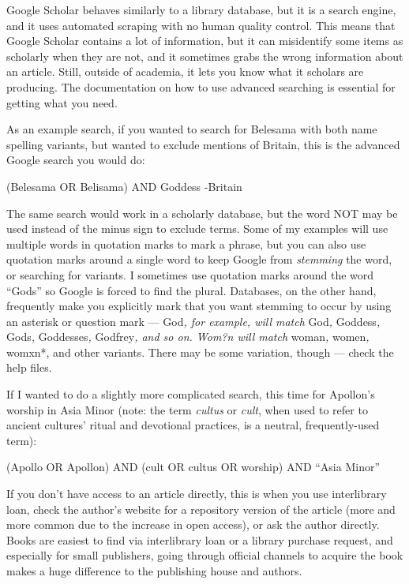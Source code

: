 \documentclass[
]{book}
\begin{document}
Google Scholar behaves similarly to a library database, but it is a search engine, and it uses automated scraping with no human quality control. This means that Google Scholar contains a lot of information, but it can misidentify some items as scholarly when they are not, and it sometimes grabs the wrong information about an article. Still, outside of academia, it lets you know what it scholars are producing. The documentation on how to use advanced searching is essential for getting what you need.

As an example search, if you wanted to search for Belesama with both name spelling variants, but wanted to exclude mentions of Britain, this is the advanced Google search you would do:

(Belesama OR Belisama) AND Goddess -Britain

The same search would work in a scholarly database, but the word NOT may be used instead of the minus sign to exclude terms. Some of my examples will use multiple words in quotation marks to mark a phrase, but you can also use quotation marks around a single word to keep Google from \emph{stemming} the word, or searching for variants. I sometimes use quotation marks around the word ``Gods'' so Google is forced to find the plural. Databases, on the other hand, frequently make you explicitly mark that you want stemming to occur by using an asterisk or question mark --- God\emph{, for example, will match }God\emph{, }Goddess\emph{, }Gods\emph{, }Goddesses\emph{, }Godfrey\emph{, and so on. Wom?n will match }woman\emph{, }women\emph{, }womxn*, and other variants. There may be some variation, though --- check the help files.

If I wanted to do a slightly more complicated search, this time for Apollon's worship in Asia Minor (note: the term \emph{cultus} or \emph{cult}, when used to refer to ancient cultures' ritual and devotional practices, is a neutral, frequently-used term):

(Apollo OR Apollon) AND (cult OR cultus OR worship) AND ``Asia Minor''

If you don't have access to an article directly, this is when you use interlibrary loan, check the author's website for a repository version of the article (more and more common due to the increase in open access), or ask the author directly. Books are easiest to find via interlibrary loan or a library purchase request, and especially for small publishers, going through official channels to acquire the book makes a huge difference to the publishing house and authors.
\end{document}
